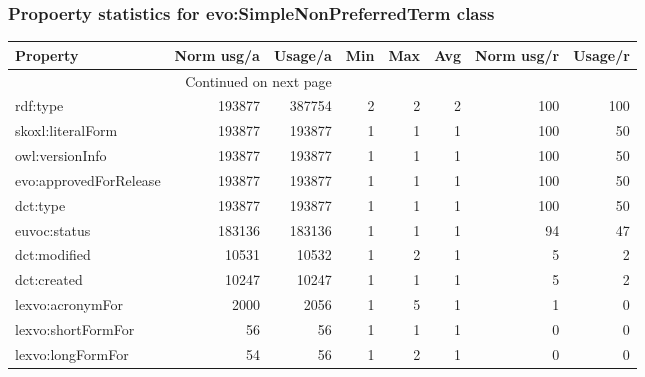 \documentclass[10pt,a4paper,titlepage,final]{article}
\begin{document}
\subsubsection{Propoerty statistics for evo:SimpleNonPreferredTerm class}
\begin{longtable}{lrrrrrrr}
\toprule
               Property &  Norm usg/a &  Usage/a &  Min &  Max &  Avg &  Norm usg/r &  Usage/r \\
\midrule
\endhead
\midrule
\multicolumn{3}{r}{{Continued on next page}} \\
\midrule
\endfoot

\bottomrule
\endlastfoot
               rdf:type &      193877 &   387754 &    2 &    2 &    2 &         100 &      100 \\
      skoxl:literalForm &      193877 &   193877 &    1 &    1 &    1 &         100 &       50 \\
        owl:versionInfo &      193877 &   193877 &    1 &    1 &    1 &         100 &       50 \\
 evo:approvedForRelease &      193877 &   193877 &    1 &    1 &    1 &         100 &       50 \\
               dct:type &      193877 &   193877 &    1 &    1 &    1 &         100 &       50 \\
           euvoc:status &      183136 &   183136 &    1 &    1 &    1 &          94 &       47 \\
           dct:modified &       10531 &    10532 &    1 &    2 &    1 &           5 &        2 \\
            dct:created &       10247 &    10247 &    1 &    1 &    1 &           5 &        2 \\
       lexvo:acronymFor &        2000 &     2056 &    1 &    5 &    1 &           1 &        0 \\
     lexvo:shortFormFor &          56 &       56 &    1 &    1 &    1 &           0 &        0 \\
      lexvo:longFormFor &          54 &       56 &    1 &    2 &    1 &           0 &        0 \\
\end{longtable}
\end{document}
